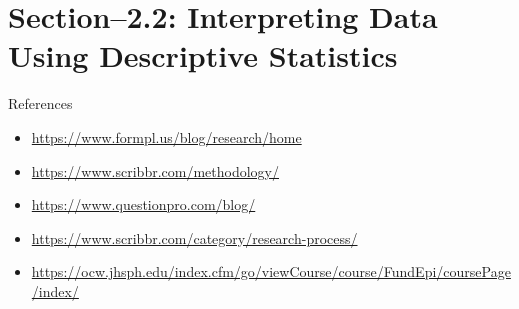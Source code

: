 

\maketitle
\section{Section--2.2: Interpreting Data Using Descriptive Statistics}


 
 
% 
% 


\begin{frame}[t]{References}
	\begin{itemize}
		\item \url{https://www.formpl.us/blog/research/home}
		\item \url{https://www.scribbr.com/methodology/}
		\item \url{https://www.questionpro.com/blog/}
		\item \url{https://www.scribbr.com/category/research-process/}
		\item 
		\url{https://ocw.jhsph.edu/index.cfm/go/viewCourse/course/FundEpi/coursePage/index/}
	\end{itemize}
\end{frame}


